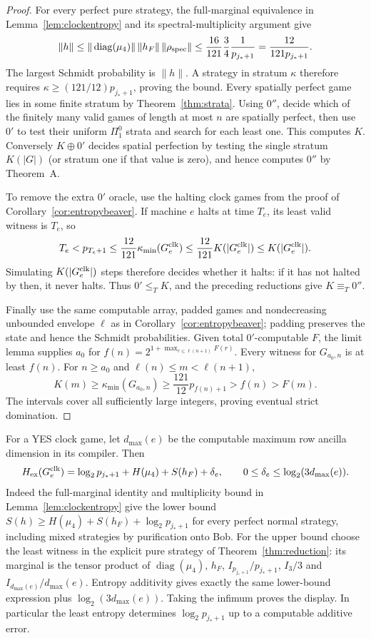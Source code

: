 \begin{proof}
For every perfect pure strategy, the full-marginal equivalence in
Lemma~\ref{lem:clockentropy} and its spectral-multiplicity argument give
\[
 \|h\|\le\|\operatorname{diag}(\mu_4)\|\,\|h_F\|\,
 \|\rho_{\rm spec}\|\le\frac{16}{121}\frac34\frac1{p_{j_*+1}}
 =\frac{12}{121p_{j_*+1}}.
\]
The largest Schmidt probability is $\|h\|$. A strategy in stratum
$\kappa$ therefore requires $\kappa\ge(121/12)p_{j_*+1}$, proving the bound.
Every spatially perfect game lies in some finite stratum by
Theorem~\ref{thm:strata}. Using $0''$, decide which of the finitely many
valid games of length at most $n$ are spatially perfect, then use $0'$
to test their uniform $\Pi^0_1$ strata and search for each least one.
This computes $K$. Conversely $K\oplus0'$ decides spatial perfection
by testing the single stratum $K(|G|)$ (or stratum one if that value is
zero), and hence computes $0''$ by Theorem~A.

To remove the extra $0'$ oracle, use the halting clock games from the
proof of Corollary~\ref{cor:entropybeaver}. If machine $e$ halts at time
$T_e$, its least valid witness is $T_e$, so
\[
 T_e<p_{T_e+1}\le\frac{12}{121}\kappa_{\min}(G^{\rm clk}_e)
 \le\frac{12}{121}K(|G^{\rm clk}_e|)\le K(|G^{\rm clk}_e|).
\]
Simulating $K(|G^{\rm clk}_e|)$ steps therefore decides whether it halts:
if it has not halted by then, it never halts. Thus $0'\le_T K$, and
the preceding reductions give $K\equiv_T0''$.

Finally use the same computable array, padded games and nondecreasing
unbounded envelope $\ell$ as in Corollary~\ref{cor:entropybeaver}; padding
preserves the state and hence the Schmidt probabilities. Given total
$0'$-computable $F$, the limit lemma supplies $a_0$ for
$f(n)=2^{1+\max_{r\le \ell(n+1)}F(r)}$. Every witness for $G_{a_0,n}$
is at least $f(n)$. For $n\ge a_0$ and $\ell(n)\le m<\ell(n+1)$,
\[
 K(m)\ge\kappa_{\min}(G_{a_0,n})
 \ge\frac{121}{12}p_{f(n)+1}>f(n)>F(m).
\]
The intervals cover all sufficiently large integers, proving eventual
strict domination.
\end{proof}

\begin{remark}
For a YES clock game, let $d_{\max}(e)$ be the computable maximum row
ancilla dimension in its compiler. Then
\[
 H_{\rm ex}(G^{\rm clk}_e)=\log_2p_{j_*+1}+H(\mu_4)+S(h_F)+\delta_e,
 \qquad 0\le\delta_e\le\log_2(3d_{\max}(e)).
\]
Indeed the full-marginal identity and multiplicity bound in
Lemma~\ref{lem:clockentropy} give the lower bound
$S(h)\ge H(\mu_4)+S(h_F)+\log_2p_{j_*+1}$ for every perfect
normal strategy, including mixed strategies by purification onto Bob.
For the upper bound choose the least witness in the explicit pure
strategy of Theorem~\ref{thm:reduction}: its marginal is the tensor
product of $\operatorname{diag}(\mu_4)$, $h_F$,
$I_{p_{j_*+1}}/p_{j_*+1}$, $I_3/3$ and
$I_{d_{\max}(e)}/d_{\max}(e)$. Entropy additivity gives exactly the
same lower-bound expression plus $\log_2(3d_{\max}(e))$.
Taking the infimum proves the display. In particular the least entropy
determines $\log_2p_{j_*+1}$ up to a computable additive error.
\end{remark}

